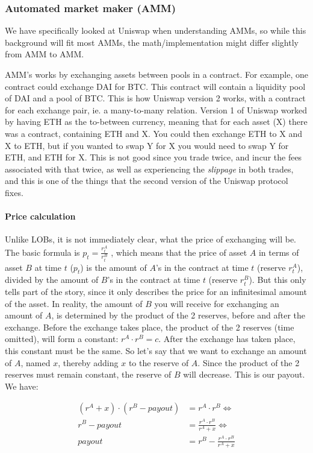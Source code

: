 \subsubsection{Automated market maker (AMM)}
We have specifically looked at Uniswap when understanding AMMs, so while this
background will fit most AMMs, the math/implementation might differ slightly
from AMM to AMM.

AMM's works by exchanging assets between pools in a contract. For example, one
contract could exchange DAI for BTC. This contract will contain a liquidity pool
of DAI and a pool of BTC. This is how Uniswap version 2 works, with a contract
for each exchange pair, ie. a many-to-many relation. Version 1 of Uniswap worked
by having ETH as the to-between currency, meaning that for each asset (X) there
was a contract, containing ETH and X. You could then exchange ETH to X and X to
ETH, but if you wanted to swap Y for X you would need to swap Y for ETH, and ETH
for X. This is not good since you trade twice, and incur the fees associated
with that twice, as well as experiencing the \textit{slippage} in both trades,
and this is one of the things that the second version of the Uniswap protocol fixes.

\paragraph{Price calculation}
Unlike LOBs, it is not immediately clear, what the price of exchanging will be.
The basic formula is $p_t=\frac{r^A_t}{r^B_t}$ \cite[eq 1, page 2]{uniswap},
which means that the price of asset $A$ in terms of asset $B$ at time $t$
($p_t$) is the amount of $A$'s in the contract at time $t$ (reserve $r^A_t$),
divided by the amount of $B$'s in the contract at time $t$ (reserve $r^B_t$).
But this only tells part of the story, since it only describes the price for an
infinitesimal amount of the asset. In reality, the amount of $B$ you will receive
for exchanging an amount of $A$, is determined by the product of the 2 reserves,
before and after the exchange. Before the exchange takes place, the product of
the 2 reserves (time omitted), will form a constant: $r^A \cdot r^B = c$. After
the exchange has taken place, this constant must be the same. So let's say that
we want to exchange an amount of $A$, named $x$, thereby adding $x$ to the
reserve of $A$. Since the product of the 2 reserves must remain constant, the
reserve of $B$ will decrease. This is our payout. We have:

\begin{align*}
  (r^A + x) \cdot (r^B - payout) & = r^A \cdot r^B \Leftrightarrow                 \\
  r^B - payout                   & = \frac{r^A \cdot r^B}{r^A + x} \Leftrightarrow \\
  payout                         & = r^B - \frac{r^A \cdot r^B}{r^A + x}
\end{align*}

